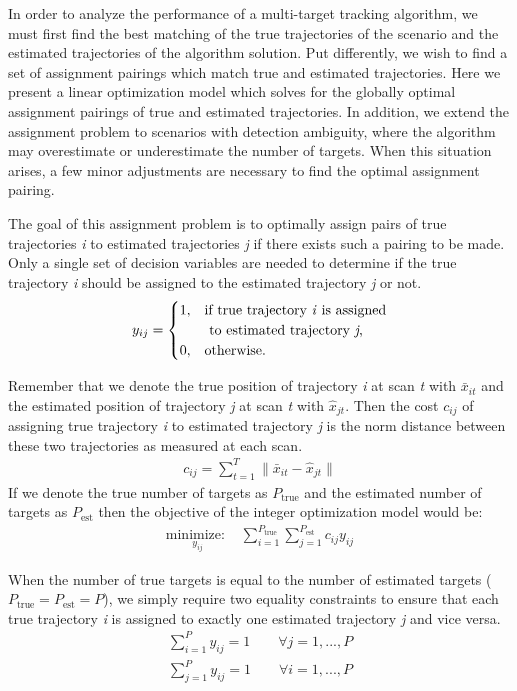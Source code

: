 In order to analyze the performance of a multi-target tracking algorithm, we must first find the best matching of the true trajectories of the scenario and the estimated trajectories of the algorithm solution. Put differently, we wish to find a set of assignment pairings which match true and estimated trajectories. Here we present a linear optimization model which solves for the globally optimal assignment pairings of true and estimated trajectories. In addition, we extend the assignment problem to scenarios with detection ambiguity, where the algorithm may overestimate or underestimate the number of targets. When this situation arises, a few minor adjustments are necessary to find the optimal assignment pairing. 

The goal of this assignment problem is to optimally assign pairs of true trajectories \textit{i} to estimated trajectories \textit{j} if there exists such a pairing to be made. Only a single set of decision variables are needed to determine if the true trajectory \textit{i} should be assigned to the estimated trajectory \textit{j} or not. 
\[y_{ij} = 
\begin{cases}
1, & \text{if true trajectory \textit{i} is assigned}\\
    & \text{ to estimated trajectory \textit{j},}\\
0, & \text{otherwise.}
\end{cases}\]

Remember that we denote the true position of trajectory \textit{i} at scan \textit{t} with $\bar{x}_{it}$ and the estimated position of trajectory \textit{j} at scan \textit{t} with $\hat{x}_{jt}$. Then the cost $c_{ij}$ of assigning true trajectory \textit{i} to estimated trajectory \textit{j} is the norm distance between these two trajectories as measured at each scan. 
\begin{align*}
	c_{ij} = \sum_{t=1}^{T} \|\bar{x}_{it} - \hat{x}_{jt}\|
\end{align*}
If we denote the true number of targets as $P_{\text{true}}$ and the estimated number of targets as $P_{\text{est}}$ then the objective of the integer optimization model would be:
\begin{align*}
\underset{y_{ij}}{\text{minimize: }} & \sum_{i=1}^{P_{\text{true}}} \sum_{j=1}^{P_{\text{est}}} c_{ij}y_{ij}
\end{align*}

When the number of true targets is equal to the number of estimated targets ($P_{\text{true}} = P_{\text{est}} = P$), we simply require two equality constraints to ensure that each true trajectory \textit{i} is assigned to exactly one estimated trajectory \textit{j} and vice versa. 
\begin{align}\label{eqn:assignment_1}
\sum_{i=1}^{P} y_{ij} = 1 \qquad \forall j = 1,...,P
\end{align}
\begin{align}\label{eqn:assignment_2}
\sum_{j=1}^{P} y_{ij} = 1 \qquad \forall i = 1,...,P
\end{align}

